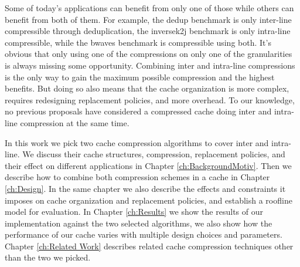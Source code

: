 Some of today's applications can benefit from only one of those while others can benefit from both of them. For example, the dedup\cite{parsec} benchmark is only inter-line compressible through deduplication\cite{dedup}, the inversek2j\cite{axbench} benchmark is only intra-line compressible, while the bwaves\cite{spec} benchmark is compressible using both. It's obvious that only using one of the compressions on only one of the granularities is always missing some opportunity. Combining inter and intra-line compressions is the only way to gain the maximum possible compression and the highest benefits. But doing so also means that the cache organization is more complex, requires redesigning replacement policies, and more overhead. To our knowledge, no previous proposals have considered a compressed cache doing inter and intra-line compression at the same time.\par
In this work we pick two cache compression algorithms to cover inter and intra-line. We discuss their cache structures, compression, replacement policies, and their effect on different applications in Chapter \ref{ch:BackgroundMotiv}. Then we describe how to combine both compression schemes in a cache in Chapter \ref{ch:Design}. In the same chapter we also describe the effects and constraints it imposes on cache organization and replacement policies, and establish a roofline model for evaluation. In Chapter \ref{ch:Results} we show the results of our implementation against the two selected algorithms, we also show how the performance of our cache varies with multiple design choices and parameters. Chapter \ref{ch:Related Work} describes related cache compression techniques other than the two we picked.